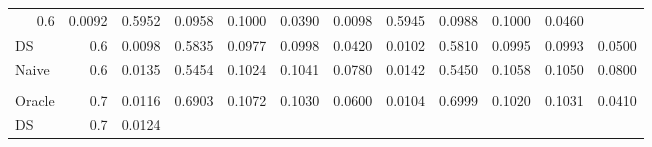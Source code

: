 \begin{tabular}{llllllllllll}
  \multicolumn{1}{|r}{0.6} &
  \multicolumn{1}{r}{0.0092} &
  \multicolumn{1}{r}{0.5952} &
  \multicolumn{1}{r}{0.0958} &
  \multicolumn{1}{r}{0.1000} &
  \multicolumn{1}{r}{0.0390} &
  \multicolumn{1}{r}{0.0098} &
  \multicolumn{1}{r}{0.5945} &
  \multicolumn{1}{r}{0.0988} &
  \multicolumn{1}{r}{0.1000} &
  \multicolumn{1}{r}{0.0460} \\
\multicolumn{1}{l}{\hspace{1em}DS} &
  \multicolumn{1}{|r}{0.6} &
  \multicolumn{1}{r}{0.0098} &
  \multicolumn{1}{r}{0.5835} &
  \multicolumn{1}{r}{0.0977} &
  \multicolumn{1}{r}{0.0998} &
  \multicolumn{1}{r}{0.0420} &
  \multicolumn{1}{r}{0.0102} &
  \multicolumn{1}{r}{0.5810} &
  \multicolumn{1}{r}{0.0995} &
  \multicolumn{1}{r}{0.0993} &
  \multicolumn{1}{r}{0.0500} \\
\multicolumn{1}{l}{\hspace{1em}Naive} &
  \multicolumn{1}{|r}{0.6} &
  \multicolumn{1}{r}{0.0135} &
  \multicolumn{1}{r}{0.5454} &
  \multicolumn{1}{r}{0.1024} &
  \multicolumn{1}{r}{0.1041} &
  \multicolumn{1}{r}{0.0780} &
  \multicolumn{1}{r}{0.0142} &
  \multicolumn{1}{r}{0.5450} &
  \multicolumn{1}{r}{0.1058} &
  \multicolumn{1}{r}{0.1050} &
  \multicolumn{1}{r}{0.0800} \\
\multicolumn{1}{l}{} &
  \multicolumn{1}{|r}{} &
  \multicolumn{1}{r}{} &
  \multicolumn{1}{r}{} &
  \multicolumn{1}{r}{} &
  \multicolumn{1}{r}{} &
  \multicolumn{1}{r}{} &
  \multicolumn{1}{r}{} &
  \multicolumn{1}{r}{} &
  \multicolumn{1}{r}{} &
  \multicolumn{1}{r}{} &
  \multicolumn{1}{r}{} \\
\multicolumn{1}{l}{\hspace{1em}Oracle} &
  \multicolumn{1}{|r}{0.7} &
  \multicolumn{1}{r}{0.0116} &
  \multicolumn{1}{r}{0.6903} &
  \multicolumn{1}{r}{0.1072} &
  \multicolumn{1}{r}{0.1030} &
  \multicolumn{1}{r}{0.0600} &
  \multicolumn{1}{r}{0.0104} &
  \multicolumn{1}{r}{0.6999} &
  \multicolumn{1}{r}{0.1020} &
  \multicolumn{1}{r}{0.1031} &
  \multicolumn{1}{r}{0.0410} \\
\multicolumn{1}{l}{\hspace{1em}DS} &
  \multicolumn{1}{|r}{0.7} &
  \multicolumn{1}{r}{0.0124} &

\end{tabular}
